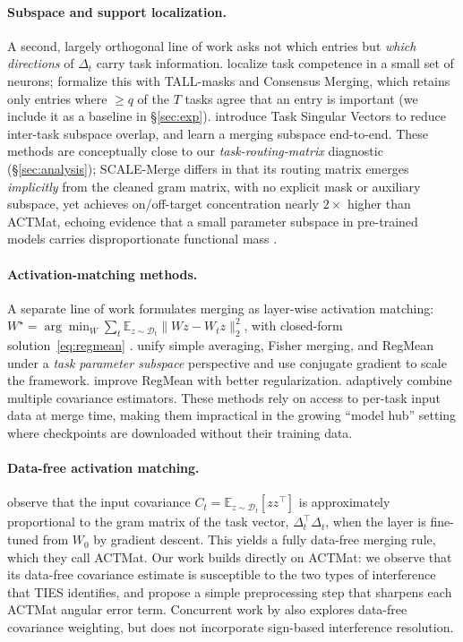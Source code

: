 \documentclass{article} %
\newcommand{\ws}{W^\star}
\begin{document}
\paragraph{Subspace and support localization.} A second, largely orthogonal line of work asks not which entries but \emph{which directions} of $\Delta_t$ carry task information. \citet{panigrahi2023task} localize task competence in a small set of neurons; \citet{wang2024localizing} formalize this with TALL-masks and Consensus Merging, which retains only entries where $\geq q$ of the $T$ tasks agree that an entry is important (we include it as a baseline in \S\ref{sec:exp}). \citet{marczak2025tsv} introduce Task Singular Vectors to reduce inter-task subspace overlap, and \citet{tang2023concrete} learn a merging subspace end-to-end. These methods are conceptually close to our \emph{task-routing-matrix} diagnostic (\S\ref{sec:analysis}); SCALE-Merge differs in that its routing matrix emerges \emph{implicitly} from the cleaned gram matrix, with no explicit mask or auxiliary subspace, yet achieves on/off-target concentration nearly $2\times$ higher than ACTMat, echoing evidence that a small parameter subspace in pre-trained models carries disproportionate functional mass \citep{geva2021transformer,molchanov2017variational}.

\paragraph{Activation-matching methods.} A separate line of work formulates merging as layer-wise activation matching: $\ws = \arg\min_W \sum_t \mathbb{E}_{z\sim\mathcal{D}_t}\|Wz - W_t z\|^2_2$, with closed-form solution~\eqref{eq:regmean} \citep{jin2023dataless}. \citet{tam2024mats} unify simple averaging, Fisher merging, and RegMean under a \emph{task parameter subspace} perspective and use conjugate gradient to scale the framework. \citet{regmean2025} improve RegMean with better regularization. \citet{aceemrging2026} adaptively combine multiple covariance estimators. These methods rely on access to per-task input data at merge time, making them impractical in the growing ``model hub'' setting where checkpoints are downloaded without their training data.

\paragraph{Data-free activation matching.} \citet{hameed2025actmat} observe that the input covariance $C_t = \mathbb{E}_{z\sim\mathcal{D}_t}[zz^\top]$ is approximately proportional to the gram matrix of the task vector, $\Delta_t^\top \Delta_t$, when the layer is fine-tuned from $W_0$ by gradient descent. This yields a fully data-free merging rule, which they call ACTMat. Our work builds directly on ACTMat: we observe that its data-free covariance estimate is susceptible to the two types of interference that TIES identifies, and propose a simple preprocessing step that sharpens each ACTMat angular error term. Concurrent work by \citet{bowen2024weighted} also explores data-free covariance weighting, but does not incorporate sign-based interference resolution.
\end{document}
